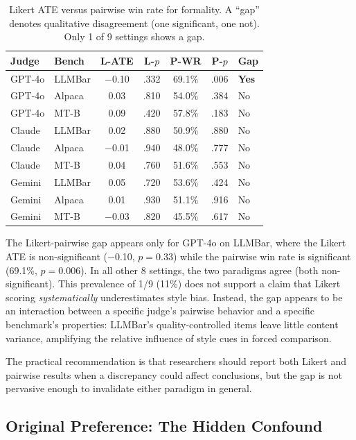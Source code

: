 \documentclass[11pt,a4paper]{article}
\begin{document}
\begin{table}[t]
\centering
\caption{Likert ATE versus pairwise win rate for formality. A ``gap'' denotes qualitative disagreement (one significant, one not). Only 1 of 9 settings shows a gap.}
\label{tab:likert-pairwise}
\small
\begin{tabular}{llccccl}
\toprule
\textbf{Judge} & \textbf{Bench} & \textbf{L-ATE} & \textbf{L-$p$} & \textbf{P-WR} & \textbf{P-$p$} & \textbf{Gap} \\
\midrule
GPT-4o & LLMBar & $-$0.10 & .332 & 69.1\% & .006 & \textbf{Yes} \\
GPT-4o & Alpaca & 0.03 & .810 & 54.0\% & .384 & No \\
GPT-4o & MT-B & 0.09 & .420 & 57.8\% & .183 & No \\
Claude & LLMBar & 0.02 & .880 & 50.9\% & .880 & No \\
Claude & Alpaca & $-$0.01 & .940 & 48.0\% & .777 & No \\
Claude & MT-B & 0.04 & .760 & 51.6\% & .553 & No \\
Gemini & LLMBar & 0.05 & .720 & 53.6\% & .424 & No \\
Gemini & Alpaca & 0.01 & .930 & 51.1\% & .916 & No \\
Gemini & MT-B & $-$0.03 & .820 & 45.5\% & .617 & No \\
\bottomrule
\end{tabular}
\end{table}

The Likert-pairwise gap appears only for GPT-4o on LLMBar, where the Likert ATE is non-significant ($-$0.10, $p=0.33$) while the pairwise win rate is significant (69.1\%, $p=0.006$).
In all other 8 settings, the two paradigms agree (both non-significant).
This prevalence of 1/9 (11\%) does not support a claim that Likert scoring \emph{systematically} underestimates style bias.
Instead, the gap appears to be an interaction between a specific judge's pairwise behavior and a specific benchmark's properties: LLMBar's quality-controlled items leave little content variance, amplifying the relative influence of style cues in forced comparison.

The practical recommendation is that researchers should report both Likert and pairwise results when a discrepancy could affect conclusions, but the gap is not pervasive enough to invalidate either paradigm in general.

\subsection{Original Preference: The Hidden Confound}
\label{sec:original-pref}
\end{document}

